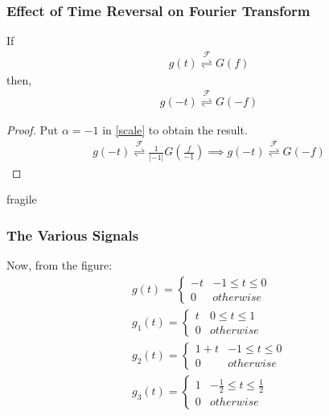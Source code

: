 \documentclass{beamer}
\providecommand{\brak}[1]{\ensuremath{\left(#1\right)}}
\providecommand{\fourier}{\overset{\mathcal{F}}{ \rightleftharpoons}}
\providecommand{\abs}[1]{\left\vert#1\right\vert}
\begin{document}
\begin{frame}[fragile]
\frametitle{Effect of Time Reversal on Fourier Transform}
\begin{flushleft}
\begin{lemma}
If 
\begin{align}
    g(t) \fourier G(f)
\end{align}
then,
\begin{align}
    g(- t) \fourier G(-f)
\end{align}
\label{reverse}
\end{lemma}
\begin{proof}
Put $\alpha = -1$ in \eqref{scale} to obtain the result.
\begin{align}
    g(-t) \fourier \frac{1}{\abs{-1}}G\brak{\frac{f}{-1}} \implies
    g(-t) \fourier G(-f)
\end{align}
\end{proof}
\end{flushleft}

\end{frame}

\begin{frame}{fragile}
\frametitle{The Various Signals}

\begin{flushleft}
Now, from the figure:
\begin{align}
    g(t) = 
    \begin{cases}
    -t & -1 \leq t \leq 0\\
    0 & otherwise
    \end{cases}\\
    g_1(t) = 
    \begin{cases}
    t & 0 \leq t \leq 1\\
    0 & otherwise
    \end{cases}\\
    g_2(t) = 
    \begin{cases}
    1+t & -1 \leq t \leq 0\\
    0 & otherwise
    \end{cases}\\
    g_3(t) = 
    \begin{cases}
    1 & -\frac{1}{2} \leq t \leq \frac{1}{2}\\
    0 & otherwise
    \end{cases}
\end{align}
\end{flushleft}
\end{frame}
\end{document}
